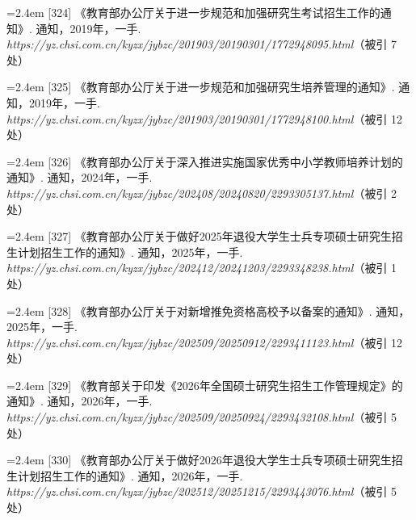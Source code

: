 {\vspace{0.6pt}
\vspace{3.5pt}\par
\nopagebreak\vspace{1pt}
\noindent\hangindent=2.4em \label{src:S0431}{\color{cAccent}[324]} 《教育部办公厅关于进一步规范和加强研究生考试招生工作的通知》. 通知，2019年，一手. \textit{https://yz.chsi.com.cn/kyzx/jybzc/201903/20190301/1772948095.html}（被引 7 处）\par
\vspace{0.6pt}
\noindent\hangindent=2.4em \label{src:S0432}{\color{cAccent}[325]} 《教育部办公厅关于进一步规范和加强研究生培养管理的通知》. 通知，2019年，一手. \textit{https://yz.chsi.com.cn/kyzx/jybzc/201903/20190301/1772948100.html}（被引 12 处）\par
\vspace{0.6pt}
\noindent\hangindent=2.4em \label{src:S0433}{\color{cAccent}[326]} 《教育部办公厅关于深入推进实施国家优秀中小学教师培养计划的通知》. 通知，2024年，一手. \textit{https://yz.chsi.com.cn/kyzx/jybzc/202408/20240820/2293305137.html}（被引 2 处）\par
\vspace{0.6pt}
\noindent\hangindent=2.4em \label{src:S0435}{\color{cAccent}[327]} 《教育部办公厅关于做好2025年退役大学生士兵专项硕士研究生招生计划招生工作的通知》. 通知，2025年，一手. \textit{https://yz.chsi.com.cn/kyzx/jybzc/202412/20241203/2293348238.html}（被引 1 处）\par
\vspace{0.6pt}
\noindent\hangindent=2.4em \label{src:S0436}{\color{cAccent}[328]} 《教育部办公厅关于对新增推免资格高校予以备案的通知》. 通知，2025年，一手. \textit{https://yz.chsi.com.cn/kyzx/jybzc/202509/20250912/2293411123.html}（被引 12 处）\par
\vspace{0.6pt}
\noindent\hangindent=2.4em \label{src:S0437}{\color{cAccent}[329]} 《教育部关于印发《2026年全国硕士研究生招生工作管理规定》的通知》. 通知，2026年，一手. \textit{https://yz.chsi.com.cn/kyzx/jybzc/202509/20250924/2293432108.html}（被引 5 处）\par
\vspace{0.6pt}
\noindent\hangindent=2.4em \label{src:S0440}{\color{cAccent}[330]} 《教育部办公厅关于做好2026年退役大学生士兵专项硕士研究生招生计划招生工作的通知》. 通知，2026年，一手. \textit{https://yz.chsi.com.cn/kyzx/jybzc/202512/20251215/2293443076.html}（被引 5 处）\par
}
